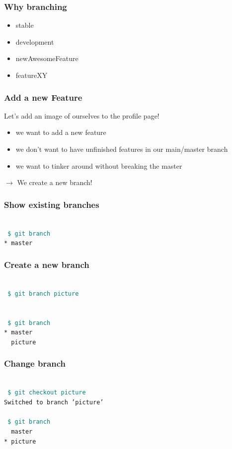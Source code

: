 \documentclass[aspectratio=169]{beamer}
\newcommand{\shellcmd}[1]{~\\ \indent\indent\texttt{\textcolor{teal}{ \$ #1}\\}}
\begin{document}

\begin{frame}
\frametitle{Why branching}
\begin{itemize}
	\item stable
	\item development
	\item newAwesomeFeature
	\item featureXY
\end{itemize}
\end{frame}


\begin{frame}
\frametitle{Add a new Feature}
Let's add an image of ourselves to the profile page!
\vspace{0.5cm}
\begin{itemize}
	\item we want to add a new feature
	\item we don't want to have unfinished features in our main/master branch
	\item we want to tinker around without breaking the master
\end{itemize}
\vspace{0.5cm}
$\rightarrow$ We create a new branch!
\end{frame}


\begin{frame}
\frametitle{Show existing branches}
\shellcmd{git branch}
\texttt{* master}
\end{frame}


\begin{frame}
\frametitle{Create a new branch}
\shellcmd{git branch picture}
~\\
\shellcmd{git branch}
\texttt{* master \\ ~~picture}

\end{frame}


\begin{frame}
\frametitle{Change branch}
\shellcmd{git checkout picture}
\texttt{Switched to branch 'picture'}
~\\
\shellcmd{git branch}
\texttt{~~master\\ * picture
}
\end{frame}
\end{document}
